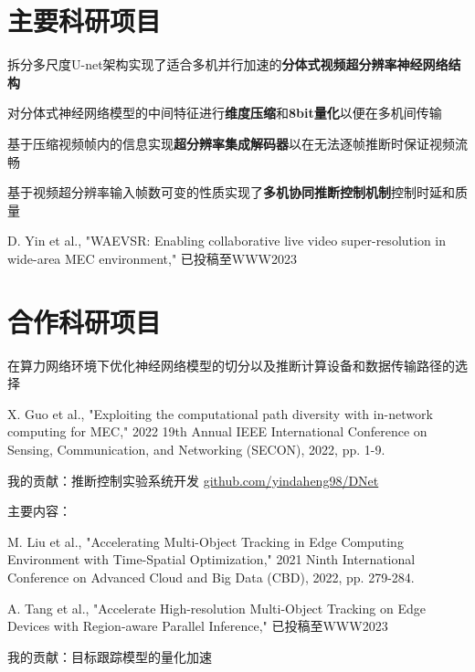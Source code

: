 \documentclass[]{deedy-resume-openfont}
\begin{document}
\begin{minipage}[t]{0.73\textwidth}


	\section{主要科研项目}
	\vspace{\topsep}
	\begin{tightemize}
		\item 拆分多尺度U-net架构实现了适合多机并行加速的{\bfseries 分体式视频超分辨率神经网络结构}
		\item 对分体式神经网络模型的中间特征进行{\bfseries 维度压缩}和{\bfseries 8bit量化}以便在多机间传输
		\item 基于压缩视频帧内的信息实现{\bfseries 超分辨率集成解码器}以在无法逐帧推断时保证视频流畅
		\item 基于视频超分辨率输入帧数可变的性质实现了{\bfseries 多机协同推断控制机制}控制时延和质量
		\item D. Yin et al., "WAEVSR: Enabling collaborative live video super-resolution in wide-area MEC environment," 已投稿至WWW2023
	\end{tightemize}
    \sectionsep

	\section{合作科研项目}
	\begin{tightemize}
		\item 在算力网络环境下优化神经网络模型的切分以及推断计算设备和数据传输路径的选择
		\item X. Guo et al., "Exploiting the computational path diversity with in-network computing for MEC," 2022 19th Annual IEEE International Conference on Sensing, Communication, and Networking (SECON), 2022, pp. 1-9.
		\item 我的贡献：推断控制实验系统开发 \href{https://github.com/yindaheng98/DNet}{github.com/yindaheng98/DNet}
	\end{tightemize}
    \sectionsep

	\begin{tightemize}
		\item 主要内容：
		\item M. Liu et al., "Accelerating Multi-Object Tracking in Edge Computing Environment with Time-Spatial Optimization," 2021 Ninth International Conference on Advanced Cloud and Big Data (CBD), 2022, pp. 279-284.
		\item A. Tang et al., "Accelerate High-resolution Multi-Object Tracking on Edge Devices with Region-aware Parallel Inference," 已投稿至WWW2023
		\item 我的贡献：目标跟踪模型的量化加速
	\end{tightemize}
    \sectionsep
	


\end{minipage}
\end{document}
